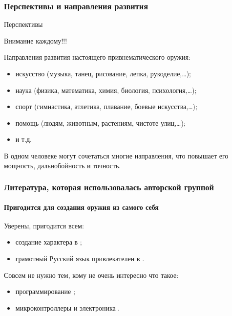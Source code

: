 \begin{frame}
    \frametitle{Перспективы и направления развития}
    
    \begin{block}{Перспективы}
        \begin{center}
            Внимание \alert{каждому}!!!
        \end{center}
    \end{block}
    
    Направления развития \alert{настоящего} привнематического оружия: 
    \begin{itemize}
        \item искусство (музыка, танец, рисование, лепка, рукоделие,\ldots);
        \item наука (физика, математика, химия, биология, психология,\ldots);
        \item спорт (гимнастика, атлетика, плавание, боевые искусства,\ldots);
        \item помощь (людям, животным, растениям, чистоте улиц,\ldots);
        \item и т.д.
    \end{itemize}
    
    \begin{block}{}
        \begin{center}
            В \alert{одном} человеке могут сочетаться \alert{многие} направления, что повышает его \alert{мощность}, \alert{дальнобойность} и \alert{точность}.
        \end{center}
    \end{block}
    
\end{frame}


\appendix

\begin{frame}
    \frametitle{Литература, которая использовалась авторской группой}
    \framesubtitle{Пригодится для создания оружия из самого себя}

    Уверены, пригодится всем:
    \begin{itemize}
        \item создание характера в \cite{bib:kovey:sevenHabits};
        \item грамотный Русский язык привлекателен в \cite{bib:gal:WordLiveAndDeath}.
    \end{itemize}
    
    \par\bigskip
    
    Совсем не нужно тем, кому не очень интересно что такое:
    \begin{itemize}
        \item программирование \cite{bib:kernigan:practice};
        \item микроконтроллеры и электроника \cite{bib:margolis:Arduino}.
    \end{itemize}
\end{frame}

